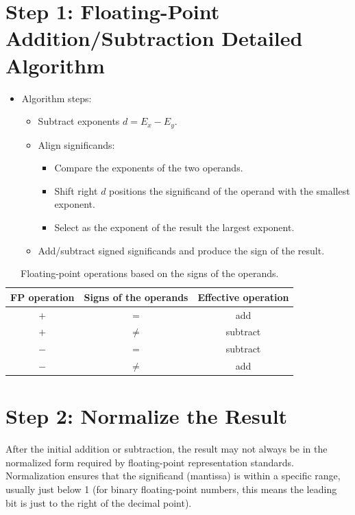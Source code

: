 \documentclass[12pt,openany, tikz,border=10pt]{book}
\begin{document}
    \section*{Step 1: Floating-Point Addition/Subtraction Detailed Algorithm}
    \begin{itemize}
        \item[] Algorithm steps:
        \begin{itemize}
            \item Subtract exponents \(d = E_x - E_y\).
            \item Align significands:
            \begin{itemize}
                \item Compare the exponents of the two operands.
                \item Shift right \(d\) positions the significand of the operand with the smallest exponent.
                \item Select as the exponent of the result the largest exponent.
            \end{itemize}
            \item Add/subtract signed significands and produce the sign of the result.
        \end{itemize}
    \end{itemize}
    
    \begin{table}[h]
    \centering
    \caption*{Floating-point operations based on the signs of the operands.}
    \begin{tabular}{ccc}
    \toprule
    FP operation & Signs of the operands & Effective operation \\
    \midrule
    \(+\)        & \(=\)                 & add                 \\
    \(+\)        & \(\neq\)              & subtract            \\
    \(-\)        & \(=\)                 & subtract            \\
    \(-\)        & \(\neq\)              & add                 \\
    \bottomrule
    \end{tabular}
    \end{table}
    
    \section*{Step 2: Normalize the Result}
    After the initial addition or subtraction, the result may not always be in the normalized form required by floating-point representation standards. Normalization ensures that the significand (mantissa) is within a specific range, usually just below 1 (for binary floating-point numbers, this means the leading bit is just to the right of the decimal point).
    
\end{document}
